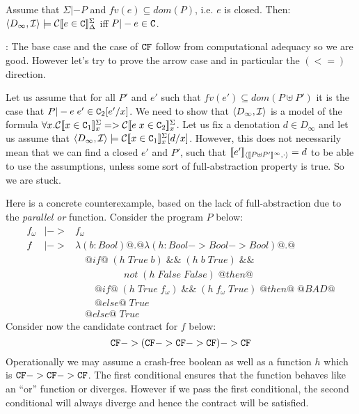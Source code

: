 \documentclass[preprint,nocopyrightspace,draft]{sigplanconf}
\begin{document}
\begin{proposition} Assume that $\Sigma |- P$ and $fv(e) \subseteq dom(P)$, i.e. $e$ is closed.
Then: $\langle D_\infty,{\cal I}\rangle \models \ctrans{\Sigma}{\Delta}{e \in \Ct}$ iff $P |- e \in \Ct$.
\end{proposition}

{:}
The base case and the case of $\CF$ follow from computational adequacy so we are good. However
let's try to prove the arrow case and in particular the $(<=)$ direction. 

Let us assume that for all $P'$ and $e'$ such that $fv(e') \subseteq dom(P\uplus P')$ it is the case that
$P |- e\;e' \in \Ct_2[e'/x]$. We need to show that $\langle D_\infty,{\cal I}\rangle$ is a model of the 
formula $\forall x. \ctrans{\Sigma}{x}{x \in \Ct_1} => \ctrans{\Sigma}{x}{e\;x \in \Ct_2}$. Let us fix
a denotation $d \in D_{\infty}$ and let us assume 
that $\langle D_{\infty},{\cal I} \rangle \models \ctrans{\Sigma}{x}{x \in \Ct_1}[d/x]$. However, this does not 
necessarily mean that we can find a closed $e'$ and $P'$, such 
that $\interp{e'}{\dbrace{P{\uplus}P'}^\infty}{\cdot} = d$ to be able to use the assumptions, unless some sort
of full-abstraction property is true. So we are stuck.

Here is a concrete counterexample, based on the lack of full-abstraction due to the {\em parallel or} function. 
Consider the program $P$ below:
\[\begin{array}{lcl}
f_\omega & |-> & f_\omega \\
f & |-> & \lambda (b{:}Bool) @.@ \lambda (h{:}Bool->Bool->Bool) @.@ \\
  &     & \quad @if@\;(h\;True\;b)\;\&\&\;(h\;b\;True)\;\&\& \\ 
  &     & \quad\qquad\qquad not\;(h\;False\;False)\;@then@ \\
  &     & \quad\quad @if@\;(h\;True\;f_\omega)\;\&\&\;(h\;f_\omega\;True)\;@then@\;@BAD@ \\
  &     & \quad\quad @else@\;True \\
  &     & \quad @else@\;True
\end{array}\]
Consider now the candidate contract for $f$ below: 
\[ \CF -> (\CF -> \CF -> \CF) -> \CF \]
Operationally we may assume a crash-free boolean as well as a function $h$ which is 
$\CF -> \CF -> \CF$. The first conditional ensures that the function behaves like an ``or'' function or 
diverges. However if we pass the first conditional, 
the second conditional will always diverge and hence the contract will be satisfied. 
\end{document}
